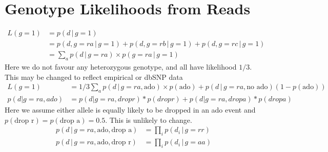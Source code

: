 \documentclass{article}
\begin{document}
\section{Genotype Likelihoods from Reads}
\begin{align*}
L(g=1) &= p(d\,|\,g=1)\\
&=p(d, g=ra \,|\, g=1) + p(d, g=rb \,|\, g=1) + p(d, g=rc \,|\, g=1)\\
&= \sum_a p(d \,|\, g=ra) \times p(g=ra \,|\, g=1)
\end{align*}
Here we do not favour any heterozygous genotype, and all have likelihood $1/3$. This may be changed to reflect empirical or dbSNP data
\begin{align*}
L(g=1) &= 1/3 \sum_a p(d \,|\, g=ra, \text{ado}) \times p(\text{ado}) + p(d \,|\, g=ra, \text{no ado})(1-p(\text{ado}))\\
p(d|g=ra, ado) &= p(d|g=ra, drop r) * p(drop r) + p(d|g=ra, drop a) * p(drop a)
\end{align*}
Here we assume either allele is equally likely to be dropped in an ado event and $p(\text{drop r}) = p(\text{drop a}) = 0.5$. This is unlikely to change.
\begin{align*}
p(d \,|\, g=ra, \text{ado}, \text{drop a}) &= \prod_i p(d_i \,|\, g=rr)\\
p(d \,|\, g=ra, \text{ado}, \text{drop r}) &= \prod_i p(d_i \,|\, g=aa)
\end{align*}
\end{document}
